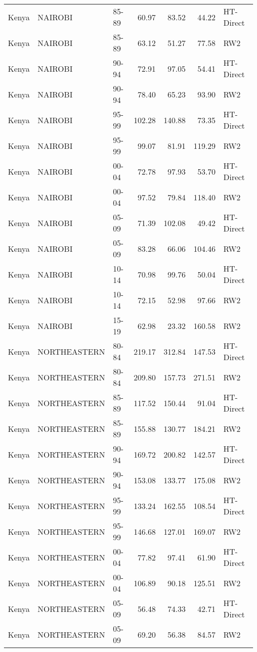 \begin{longtable}{lllrrrl}
  Kenya & NAIROBI & 85-89 & 60.97 & 83.52 & 44.22 & HT-Direct \\ 
  Kenya & NAIROBI & 85-89 & 63.12 & 51.27 & 77.58 & RW2 \\ 
  Kenya & NAIROBI & 90-94 & 72.91 & 97.05 & 54.41 & HT-Direct \\ 
  Kenya & NAIROBI & 90-94 & 78.40 & 65.23 & 93.90 & RW2 \\ 
  Kenya & NAIROBI & 95-99 & 102.28 & 140.88 & 73.35 & HT-Direct \\ 
  Kenya & NAIROBI & 95-99 & 99.07 & 81.91 & 119.29 & RW2 \\ 
  Kenya & NAIROBI & 00-04 & 72.78 & 97.93 & 53.70 & HT-Direct \\ 
  Kenya & NAIROBI & 00-04 & 97.52 & 79.84 & 118.40 & RW2 \\ 
  Kenya & NAIROBI & 05-09 & 71.39 & 102.08 & 49.42 & HT-Direct \\ 
  Kenya & NAIROBI & 05-09 & 83.28 & 66.06 & 104.46 & RW2 \\ 
  Kenya & NAIROBI & 10-14 & 70.98 & 99.76 & 50.04 & HT-Direct \\ 
  Kenya & NAIROBI & 10-14 & 72.15 & 52.98 & 97.66 & RW2 \\ 
  Kenya & NAIROBI & 15-19 & 62.98 & 23.32 & 160.58 & RW2 \\ 
  Kenya & NORTHEASTERN & 80-84 & 219.17 & 312.84 & 147.53 & HT-Direct \\ 
  Kenya & NORTHEASTERN & 80-84 & 209.80 & 157.73 & 271.51 & RW2 \\ 
  Kenya & NORTHEASTERN & 85-89 & 117.52 & 150.44 & 91.04 & HT-Direct \\ 
  Kenya & NORTHEASTERN & 85-89 & 155.88 & 130.77 & 184.21 & RW2 \\ 
  Kenya & NORTHEASTERN & 90-94 & 169.72 & 200.82 & 142.57 & HT-Direct \\ 
  Kenya & NORTHEASTERN & 90-94 & 153.08 & 133.77 & 175.08 & RW2 \\ 
  Kenya & NORTHEASTERN & 95-99 & 133.24 & 162.55 & 108.54 & HT-Direct \\ 
  Kenya & NORTHEASTERN & 95-99 & 146.68 & 127.01 & 169.07 & RW2 \\ 
  Kenya & NORTHEASTERN & 00-04 & 77.82 & 97.41 & 61.90 & HT-Direct \\ 
  Kenya & NORTHEASTERN & 00-04 & 106.89 & 90.18 & 125.51 & RW2 \\ 
  Kenya & NORTHEASTERN & 05-09 & 56.48 & 74.33 & 42.71 & HT-Direct \\ 
  Kenya & NORTHEASTERN & 05-09 & 69.20 & 56.38 & 84.57 & RW2 \\ 

\end{longtable}
